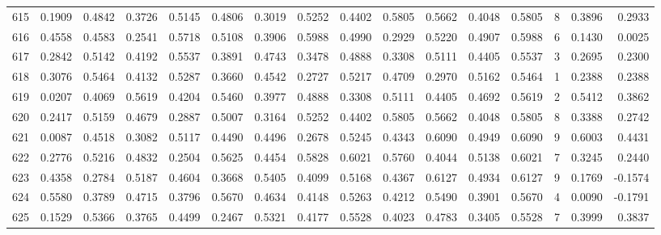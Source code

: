 \begin{tabular}{lrrrrrrrrrrrrrrr}
615 &      0.1909 &  0.4842 &  0.3726 &  0.5145 &  0.4806 &  0.3019 &  0.5252 &  0.4402 &  0.5805 &  0.5662 &   0.4048 &     0.5805 &      8 &                    0.3896 &                     0.2933 \\
616 &      0.4558 &  0.4583 &  0.2541 &  0.5718 &  0.5108 &  0.3906 &  0.5988 &  0.4990 &  0.2929 &  0.5220 &   0.4907 &     0.5988 &      6 &                    0.1430 &                     0.0025 \\
617 &      0.2842 &  0.5142 &  0.4192 &  0.5537 &  0.3891 &  0.4743 &  0.3478 &  0.4888 &  0.3308 &  0.5111 &   0.4405 &     0.5537 &      3 &                    0.2695 &                     0.2300 \\
618 &      0.3076 &  0.5464 &  0.4132 &  0.5287 &  0.3660 &  0.4542 &  0.2727 &  0.5217 &  0.4709 &  0.2970 &   0.5162 &     0.5464 &      1 &                    0.2388 &                     0.2388 \\
619 &      0.0207 &  0.4069 &  0.5619 &  0.4204 &  0.5460 &  0.3977 &  0.4888 &  0.3308 &  0.5111 &  0.4405 &   0.4692 &     0.5619 &      2 &                    0.5412 &                     0.3862 \\
620 &      0.2417 &  0.5159 &  0.4679 &  0.2887 &  0.5007 &  0.3164 &  0.5252 &  0.4402 &  0.5805 &  0.5662 &   0.4048 &     0.5805 &      8 &                    0.3388 &                     0.2742 \\
621 &      0.0087 &  0.4518 &  0.3082 &  0.5117 &  0.4490 &  0.4496 &  0.2678 &  0.5245 &  0.4343 &  0.6090 &   0.4949 &     0.6090 &      9 &                    0.6003 &                     0.4431 \\
622 &      0.2776 &  0.5216 &  0.4832 &  0.2504 &  0.5625 &  0.4454 &  0.5828 &  0.6021 &  0.5760 &  0.4044 &   0.5138 &     0.6021 &      7 &                    0.3245 &                     0.2440 \\
623 &      0.4358 &  0.2784 &  0.5187 &  0.4604 &  0.3668 &  0.5405 &  0.4099 &  0.5168 &  0.4367 &  0.6127 &   0.4934 &     0.6127 &      9 &                    0.1769 &                    -0.1574 \\
624 &      0.5580 &  0.3789 &  0.4715 &  0.3796 &  0.5670 &  0.4634 &  0.4148 &  0.5263 &  0.4212 &  0.5490 &   0.3901 &     0.5670 &      4 &                    0.0090 &                    -0.1791 \\
625 &      0.1529 &  0.5366 &  0.3765 &  0.4499 &  0.2467 &  0.5321 &  0.4177 &  0.5528 &  0.4023 &  0.4783 &   0.3405 &     0.5528 &      7 &                    0.3999 &                     0.3837 \\

\end{tabular}
